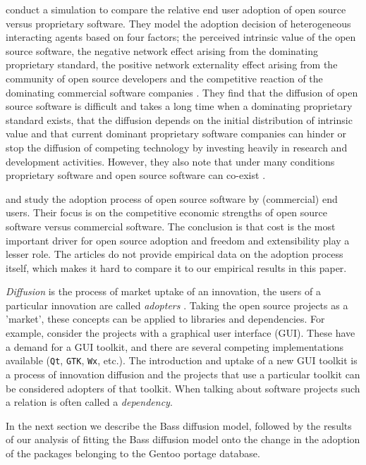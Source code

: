 \documentclass[smallextended,final]{svjour3}
\begin{document}
\citet{bonaccorsi03} conduct a simulation to compare the relative end user adoption of open source versus proprietary software. They model the adoption decision of heterogeneous interacting agents based on four factors; the perceived intrinsic value of the open source software, the negative network effect arising from the dominating proprietary standard, the positive network externality effect arising from the community of open source developers and the competitive reaction of the dominating commercial software companies \citep{bonaccorsi03}. They find that the diffusion of open source software is difficult and takes a long time when a dominating proprietary standard exists, that the diffusion depends on the initial distribution of intrinsic value and that current dominant proprietary software companies can hinder or stop the diffusion of competing technology by investing heavily in research and development activities. However, they also note that under many conditions proprietary software and open source software can co-exist \citep{bonaccorsi03}.

\citet{dedrick04} and \citet{chen06} study the adoption process of open source software by (commercial) end users. Their focus is on the competitive economic strengths of open source software versus commercial software. The conclusion is that cost is the most important driver for open source adoption and freedom and extensibility play a lesser role. The articles do not provide empirical data on the adoption process itself, which makes it hard to compare it to our empirical results in this paper.

\emph{Diffusion} is the process of market uptake of an innovation, the users of a particular innovation are called \emph{adopters} \citep{narayanan01}. Taking the open source projects as a 'market', these concepts can be applied to libraries and dependencies. For example, consider the projects with a graphical user interface (GUI). These have a demand for a GUI toolkit, and there are several competing implementations available (\verb|Qt|, \verb|GTK|, \verb|Wx|, etc.). The introduction and uptake of a new GUI toolkit is a process of innovation diffusion and the projects that use a particular toolkit can be considered adopters of that toolkit. When talking about software projects such a relation is often called a \emph{dependency}.

In the next section we describe the Bass \citep{bass69}  diffusion model, followed by the results of our analysis of fitting the Bass diffusion model onto the change in the adoption of the packages belonging to the Gentoo portage database. 
\end{document}
